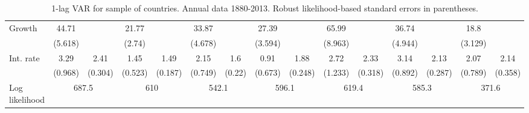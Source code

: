 \begin{table}[htbp]
\begin{tabular}{@{\extracolsep{4pt}}lcccccccccccccc@{}}
\quad Growth 	 &44.71 	 &  	 & 21.77 	 &  	 & 33.87 	 &  	 & 27.39 	 &  	 & 65.99 	 &  	 & 36.74 	 &  	 & 18.8 	 & 	 \\ 
 		 & (5.618) 	 &  	 & (2.74) 	 &  	 & (4.678) 	 &  	 & (3.594) 	 &  	 & (8.963) 	 &  	 & (4.944) 	 &  	 & (3.129) 	 &  	 \\ 
\quad Int. rate 	 &3.29 	 & 2.41 	 & 1.45 	 & 1.49 	 & 2.15 	 & 1.6 	 & 0.91 	 & 1.88 	 & 2.72 	 & 2.33 	 & 3.14 	 & 2.13 	 & 2.07 	 & 2.14	 \\ 
 		 & (0.968) 	 & (0.304) 	 & (0.523) 	 & (0.187) 	 & (0.749) 	 & (0.22) 	 & (0.673) 	 & (0.248) 	 & (1.233) 	 & (0.318) 	 & (0.892) 	 & (0.287) 	 & (0.789) 	 & (0.358) 	 \\ 
 \hline \rule{0pt}{4ex} 
  Log likelihood 	 &\multicolumn{2}{c}{687.5} 	 & \multicolumn{2}{c}{610} 	 & \multicolumn{2}{c}{542.1} 	 & \multicolumn{2}{c}{596.1} 	 & \multicolumn{2}{c}{619.4} 	 & \multicolumn{2}{c}{585.3} 	 & \multicolumn{2}{c}{371.6}\\ 

 \hline 	\end{tabular}		\caption{1-lag VAR for sample of countries. Annual data 1880-2013. Robust likelihood-based standard errors in parentheses.}
		\label{tab:all_1lag}

\end{table}